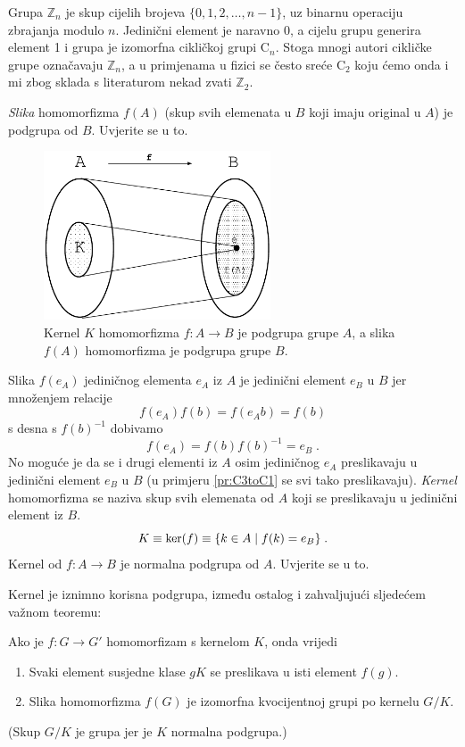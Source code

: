 \begin{primjer}
    Grupa $\mathbb{Z}_n$ je skup cijelih brojeva $\{0, 1, 2, \ldots, n-1\}$,
    uz binarnu operaciju zbrajanja modulo $n$. Jedinični element je naravno 0,
    a cijelu grupu generira element 1 i grupa je izomorfna cikličkoj grupi $\mathrm{C}_n$.
    Stoga mnogi autori cikličke grupe označavaju $\mathbb{Z}_n$, a u primjenama u fizici
    se često sreće $\mathrm{C}_2$ koju ćemo onda i mi zbog sklada s literaturom
    nekad zvati $\mathbb{Z}_2$.
\end{primjer}

\emph{Slika} homomorfizma $f(A)$ (skup svih elemenata u $B$ koji imaju original u $A$) 
je podgrupa od $B$. Uvjerite se u to.


\begin{figure}[htpb]
    \centering
    \includegraphics[width=0.6\textwidth]{pics/homomorfizam}
    \caption{Kernel $K$ homomorfizma $f:A\to B$ je podgrupa grupe $A$,
    a slika $f(A)$ homomorfizma je podgrupa grupe $B$.}
    \label{fig:kernelslika}
\end{figure}


Slika $f(e_A)$ jediničnog elementa $e_A$ iz $A$ je jedinični element $e_B$ u $B$ jer
množenjem relacije
$$ f(e_A) f(b) = f(e_A b) = f(b) $$
s desna s $f(b)^{-1}$ dobivamo
$$ f(e_A) = f(b) f(b)^{-1} = e_B \;. $$
No moguće je da se i drugi elementi iz $A$ osim jediničnog $e_A$ preslikavaju u 
jedinični element $e_B$ u $B$ (u primjeru \ref{pr:C3toC1} se svi tako preslikavaju).
\emph{Kernel} homomorfizma se naziva skup svih elemenata od $A$ koji se
preslikavaju u jedinični element iz $B$.
$$ K \equiv {\rm ker}(f) \equiv \{ k\in A \; | \; f(k) = e_B \} \;. $$
Kernel od $f:A\to B$ je normalna podgrupa od $A$. Uvjerite se u to.

Kernel je iznimno korisna podgrupa, između ostalog i zahvaljujući sljedećem
važnom teoremu:
\begin{teorem}
\label{th:izomorfizam}
Ako je $f:G\to G'$ homomorfizam s kernelom $K$, onda vrijedi
\begin{enumerate}
\item Svaki element susjedne klase $gK$ se preslikava u isti element $f(g)$.
\item Slika homomorfizma $f(G)$ je izomorfna kvocijentnoj grupi po kernelu $G/K$.
\end{enumerate}
\end{teorem}
(Skup $G/K$ je grupa jer je $K$ normalna podgrupa.)

